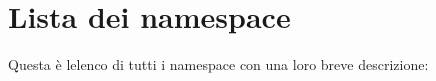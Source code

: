 \section{Lista dei namespace}
Questa è l\textquotesingle{}elenco di tutti i namespace con una loro breve descrizione\+:\begin{DoxyCompactList}
\item{}
\end{DoxyCompactList}

